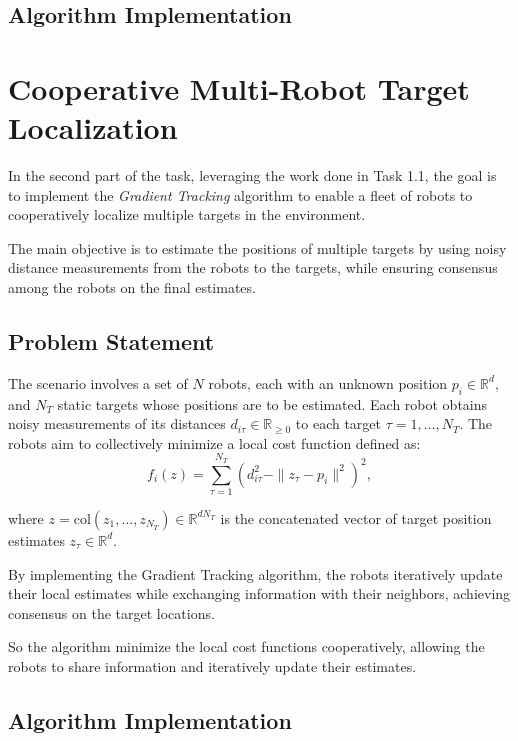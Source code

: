 \subsection{Algorithm Implementation}


\begin{tcolorbox}[colback=white,colframe=black!75!black,title=ADD IMPLEMENTATION ]

\end{tcolorbox}


\section{Cooperative Multi-Robot Target Localization}

In the second part of the task, leveraging the work done in Task 1.1, the goal is to implement the \textit{Gradient Tracking} algorithm to enable a fleet of 
robots to cooperatively localize multiple targets in the environment.

\noindent
The main objective is to estimate the positions of multiple targets by using noisy distance measurements from the robots to the targets, while ensuring consensus 
among the robots on the final estimates.

\subsection{Problem Statement}
The scenario involves a set of \( N \) robots, each with an unknown position \( p_i \in \mathbb{R}^d \), and \( N_T \) static targets whose positions are to be estimated.
\noindent
Each robot obtains noisy measurements of its distances \( d_{i\tau} \in \mathbb{R}_{\geq 0} \) to each target \( \tau = 1, \ldots, N_T \). The robots aim to collectively 
minimize a local cost function defined as: 
\begin{equation}
    f_i(z) = \sum_{\tau=1}^{N_T} \left( d_{i\tau}^2 - \| z_\tau - p_i \|^2 \right)^2,
\end{equation}
    
where \( z = \mathrm{col}(z_1, \ldots, z_{N_T}) \in \mathbb{R}^{d N_T} \) is the concatenated vector of target position estimates \( z_\tau \in \mathbb{R}^d \).

By implementing the Gradient Tracking algorithm, the robots iteratively update their local estimates while exchanging information with their neighbors, achieving 
consensus on the target locations. 

\noindent
So the algorithm minimize the local cost functions cooperatively, allowing the robots to share information and iteratively update their estimates.



\subsection{Algorithm Implementation}


\begin{tcolorbox}[colback=white,colframe=black!75!black,title=ADD IMPLEMENTATION ]

\end{tcolorbox}